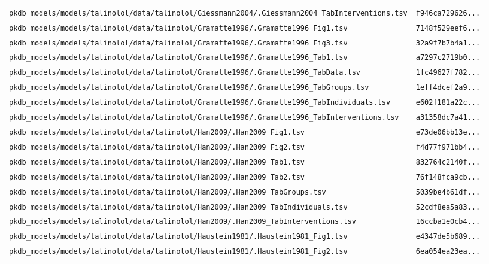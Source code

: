 \documentclass{article}
\begin{document}
\begin{longtable}{ll}
\texttt{pkdb\_models/models/talinolol/data/talinolol/Giessmann2004/.Giessmann2004\_TabInterventions.tsv} & \texttt{f946ca729626...} \\
\texttt{pkdb\_models/models/talinolol/data/talinolol/Gramatte1996/.Gramatte1996\_Fig1.tsv} & \texttt{7148f529eef6...} \\
\texttt{pkdb\_models/models/talinolol/data/talinolol/Gramatte1996/.Gramatte1996\_Fig3.tsv} & \texttt{32a9f7b7b4a1...} \\
\texttt{pkdb\_models/models/talinolol/data/talinolol/Gramatte1996/.Gramatte1996\_Tab1.tsv} & \texttt{a7297c2719b0...} \\
\texttt{pkdb\_models/models/talinolol/data/talinolol/Gramatte1996/.Gramatte1996\_TabData.tsv} & \texttt{1fc49627f782...} \\
\texttt{pkdb\_models/models/talinolol/data/talinolol/Gramatte1996/.Gramatte1996\_TabGroups.tsv} & \texttt{1eff4dcef2a9...} \\
\texttt{pkdb\_models/models/talinolol/data/talinolol/Gramatte1996/.Gramatte1996\_TabIndividuals.tsv} & \texttt{e602f181a22c...} \\
\texttt{pkdb\_models/models/talinolol/data/talinolol/Gramatte1996/.Gramatte1996\_TabInterventions.tsv} & \texttt{a31358dc7a41...} \\
\texttt{pkdb\_models/models/talinolol/data/talinolol/Han2009/.Han2009\_Fig1.tsv} & \texttt{e73de06bb13e...} \\
\texttt{pkdb\_models/models/talinolol/data/talinolol/Han2009/.Han2009\_Fig2.tsv} & \texttt{f4d77f971bb4...} \\
\texttt{pkdb\_models/models/talinolol/data/talinolol/Han2009/.Han2009\_Tab1.tsv} & \texttt{832764c2140f...} \\
\texttt{pkdb\_models/models/talinolol/data/talinolol/Han2009/.Han2009\_Tab2.tsv} & \texttt{76f148fca9cb...} \\
\texttt{pkdb\_models/models/talinolol/data/talinolol/Han2009/.Han2009\_TabGroups.tsv} & \texttt{5039be4b61df...} \\
\texttt{pkdb\_models/models/talinolol/data/talinolol/Han2009/.Han2009\_TabIndividuals.tsv} & \texttt{52cdf8ea5a83...} \\
\texttt{pkdb\_models/models/talinolol/data/talinolol/Han2009/.Han2009\_TabInterventions.tsv} & \texttt{16ccba1e0cb4...} \\
\texttt{pkdb\_models/models/talinolol/data/talinolol/Haustein1981/.Haustein1981\_Fig1.tsv} & \texttt{e4347de5b689...} \\
\texttt{pkdb\_models/models/talinolol/data/talinolol/Haustein1981/.Haustein1981\_Fig2.tsv} & \texttt{6ea054ea23ea...} \\

\end{longtable}
\end{document}
